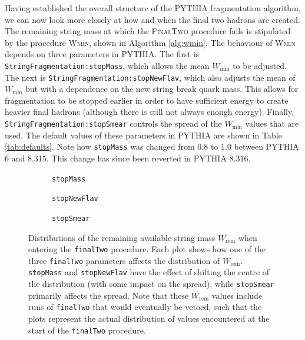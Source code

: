 \documentclass[12pt,a4paper]{report}
\begin{document}
Having established the overall structure of the PYTHIA fragmentation algorithm, we can now look more closely at how and when the final two hadrons are created. The remaining string mass at which the \textsc{FinalTwo} procedure fails is stipulated by the procedure \textsc{Wmin}, shown in Algorithm \ref{alg:wmin}. The behaviour of \textsc{Wmin} depends on three parameters in PYTHIA. The first is \texttt{StringFragmentation:stopMass}, which allows the mean $W_\text{min}$ to be adjusted. The next is \texttt{StringFragmentation:stopNewFlav}, which also adjusts the mean of $W_\text{min}$ but with a dependence on the new string break quark mass. This allows for fragmentation to be stopped earlier in order to have sufficient energy to create heavier final hadrons (although there is still not always enough energy). Finally, \texttt{StringFragmentation:stopSmear} controls the spread of the $W_\text{min}$ values that are used. The default values of these parameters in PYTHIA are shown in Table \ref{tab:defaults}. Note how \texttt{stopMass} was changed from 0.8 to 1.0 between PYTHIA 6 and 8.315. This change has since been reverted in PYTHIA 8.316.

\begin{figure}
  \centering
  \begin{subfigure}{0.32\linewidth}
    \centering
    
    \caption{\texttt{stopMass}}
    \label{fig:wrem-stopmass}
  \end{subfigure}
  \hfill
  \begin{subfigure}{0.32\linewidth}
    \centering
    
    \caption{\texttt{stopNewFlav}}
    \label{fig:wrem-stopnewflav}
  \end{subfigure}
  \hfill
  \begin{subfigure}{0.32\linewidth}
    \centering
    
    \caption{\texttt{stopSmear}}
    \label{fig:wrem-stopsmear}
  \end{subfigure}
  \caption{Distributions of the remaining available string mass $W_\text{rem}$ when entering the \texttt{finalTwo} procedure. Each plot shows how one of the three \texttt{finalTwo} parameters affects the distribution of $W_\text{rem}$. \texttt{stopMass} and \texttt{stopNewFlav} have the effect of shifting the centre of the distribution (with some impact on the spread), while \texttt{stopSmear} primarily affects the spread. Note that these $W_\text{rem}$ values include runs of \texttt{finalTwo} that would eventually be vetoed, such that the plots represent the actual distribution of values encountered at the start of the \texttt{finalTwo} procedure.}
\end{figure}
\end{document}
